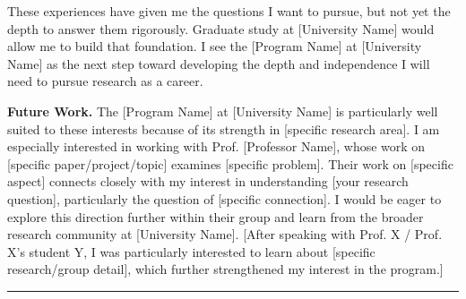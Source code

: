 \documentclass[12pt]{article}
\begin{document}
\vspace{8pt}

These experiences have given me the questions I want to pursue, but not yet the depth to answer them rigorously. Graduate study at [University Name] would allow me to build that foundation. I see the [Program Name] at [University Name] as the next step toward developing the depth and independence I will need to pursue research as a career.

\vspace{8pt}

\textbf{Future Work. }The [Program Name] at [University Name] is particularly well suited to these interests because of its strength in [specific research area]. I am especially interested in working with Prof. [Professor Name], whose work on [specific paper/project/topic] examines [specific problem]. Their work on [specific aspect] connects closely with my interest in understanding [your research question], particularly the question of [specific connection]. I would be eager to explore this direction further within their group and learn from the broader research community at [University Name]. [After speaking with Prof. X / Prof. X's student Y, I was particularly interested to learn about [specific research/group detail], which further strengthened my interest in the program.]

\vspace{4pt}
\hrule
\vspace{4pt}
\end{document}

